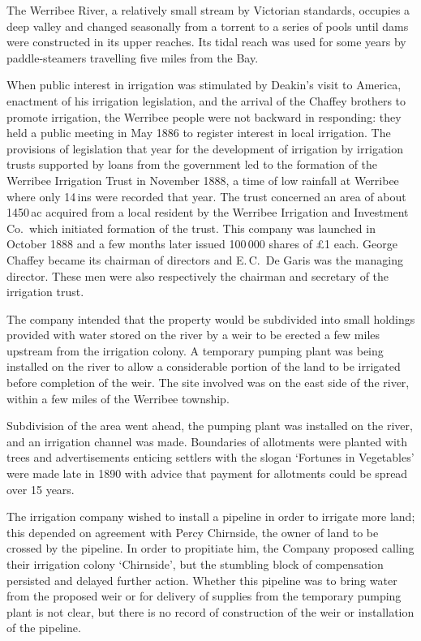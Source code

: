The Werribee River, a relatively small stream by Victorian standards,
occupies a deep valley and changed seasonally from a torrent to a
series of pools until dams were constructed in its upper reaches.  Its
tidal reach was used for some years by paddle-steamers travelling five
miles from the Bay.

When public interest in irrigation was stimulated by Deakin's visit to
America, enactment of his irrigation legislation, and the arrival of
the Chaffey brothers to promote irrigation, the Werribee people were
not backward in responding: they held a public meeting in May 1886 to
register interest in local irrigation.  The provisions of legislation
that year for the development of irrigation by irrigation trusts
supported by loans from the government led to the formation of the
Werribee Irrigation Trust in November 1888, a time of low rainfall at
Werribee where only 14\,ins were recorded that year.  The trust
concerned an area of about 1450\,ac acquired from a local resident by
the Werribee Irrigation and Investment Co.\ which initiated formation
of the trust.  This company was launched in October 1888 and a few
months later issued 100\,000 shares of \pounds1 each.  George Chaffey
became its chairman of directors and E.\,C.~De Garis was the managing
director.  These men were also respectively the chairman and secretary
of the irrigation trust.

The company intended that the property would be subdivided into small
holdings provided with water stored on the river by a weir to be
erected a few miles upstream from the irrigation colony.  A temporary
pumping plant was being installed on the river to allow a considerable
portion of the land to be irrigated before completion of the weir.
The site involved was on the east side of the river, within a few
miles of the Werribee township.

Subdivision of the area went ahead, the pumping plant was installed on
the river, and an irrigation channel was made.  Boundaries of
allotments were planted with trees and advertisements enticing
settlers with the slogan `Fortunes in Vegetables' were made late in
1890 with advice that payment for allotments could be spread over 15
years.

The irrigation company wished to install a pipeline in order to
irrigate more land; this depended on agreement with Percy Chirnside,
the owner of land to be crossed by the pipeline.  In order to
propitiate him, the Company proposed calling their irrigation colony
`Chirnside', but the stumbling block of compensation persisted and
delayed further action.  Whether this pipeline was to bring water from
the proposed weir or for delivery of supplies from the temporary
pumping plant is not clear, but there is no record of construction of
the weir or installation of the pipeline.

